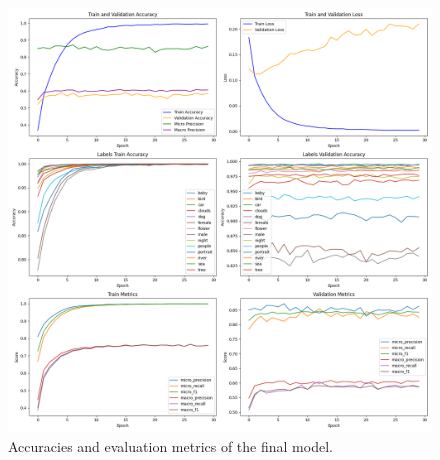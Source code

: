 \documentclass[a4paper, 12pt]{article}
\begin{document}
\begin{figure}[ht]
    \centering
    \includegraphics[width=\textwidth]{img/accuracy.png}
    \caption{Accuracies and evaluation metrics of the final model.}
    \label{fig:accuracy}
\end{figure}
\end{document}
